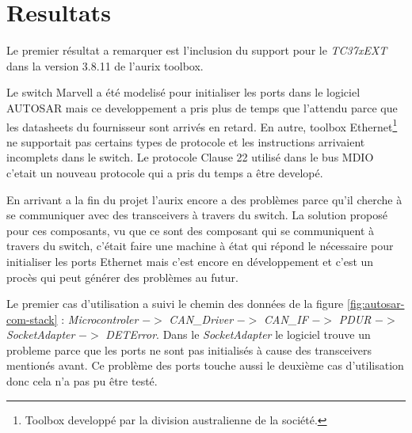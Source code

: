 \section{Resultats}

Le premier résultat a remarquer est l'inclusion du support pour le \textit{TC37xEXT} dans la version 3.8.11 de l'aurix toolbox.


Le switch Marvell a \'et\'e modelis\'e pour initialiser les ports dans le logiciel AUTOSAR mais ce developpement a pris plus de temps que l'attendu parce que les datasheets du fournisseur sont arriv\'es en retard. En autre, toolbox Ethernet\footnote{Toolbox developp\'e par la division australienne de la soci\'et\'e.} ne supportait pas certains types de protocole et les instructions arrivaient incomplets dans le switch. Le protocole Clause 22 utilis\'e dans le bus MDIO c'etait un nouveau protocole qui a pris du temps a \^etre develop\'e. 

En arrivant a la fin du projet l'aurix encore a des probl\`emes parce qu'il cherche \`a se communiquer avec des transceivers \`a travers du switch. La solution propos\'e pour ces composants, vu que ce sont des composant qui se communiquent \`a travers du switch, c'était faire une machine \`a \'etat qui répond le nécessaire pour initialiser les ports Ethernet mais c'est encore en développement et c'est un procès qui peut générer des problèmes au futur.

Le premier cas d'utilisation a suivi le chemin des donn\'ees de la figure \ref{fig:autosar-com-stack} : \textit{Microcontroler} $->$ \textit{CAN\_Driver}\cite{can_if_man} $->$ \textit{CAN\_IF}\cite{can_drv_man} $->$ \textit{PDUR}\cite{pdu_r_man} $->$ \textit{SocketAdapter}\cite{sock_adp_man} $->$ \textit{DETError}\cite{det_man}. Dans le \textit{SocketAdapter} le logiciel trouve un probleme parce que les ports ne sont pas initialis\'es \`a cause des transceivers mention\'es avant. Ce probl\`eme des ports touche aussi le deuxième cas d'utilisation donc cela n'a pas pu \^etre test\'e.
